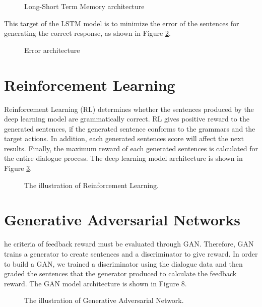 \begin{figure}[h!]
\centerline{}
\caption{Long-Short Term Memory architecture}
\label{fig:LSTM}
\end{figure}

This target of the LSTM model is to minimize the error of the sentences for generating the correct response, as shown in Figure \ref{fig:ERROR}.

\begin{figure}[h!]
\centerline{}
\caption{Error architecture}
\label{fig:ERROR}
\end{figure}

\section{Reinforcement Learning}
Reinforcement Learning (RL) determines whether the sentences produced by the deep learning model are grammatically correct. RL gives positive reward to the generated sentences, if the generated sentence conforms to the grammars and the target actions. In addition, each generated sentences score will affect the next results. Finally, the maximum reward of each generated sentences is calculated for the entire dialogue process. The deep learning model architecture is shown in Figure \ref{fig:RL}.

\begin{figure}[h!]
\centerline{}
\caption{The illustration of Reinforcement Learning.}
\label{fig:RL}
\end{figure}

\section{Generative Adversarial Networks}
he criteria of feedback reward must be evaluated through GAN. Therefore, GAN trains a generator to create sentences and a discriminator to give reward. In order to build a GAN, we trained a discriminator using the dialogue data and then graded the sentences that the generator produced to calculate the feedback reward. The GAN model architecture is shown in Figure 8.

\begin{figure}[h!]
\centerline{}
\caption{The illustration of Generative Adversarial Network.}
\label{fig:GAN}
\end{figure}



